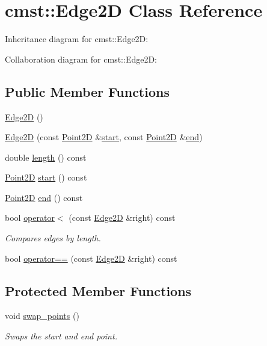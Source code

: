 \hypertarget{classcmst_1_1_edge2_d}{}\section{cmst::Edge2D Class Reference}
\label{classcmst_1_1_edge2_d}


Inheritance diagram for cmst::Edge2D:


Collaboration diagram for cmst::Edge2D:
\subsection*{Public Member Functions}
\begin{DoxyCompactItemize}
\item 
\hyperlink{classcmst_1_1_edge2_d_a5af466b468749d363692f16de84a85d5}{Edge2D} ()
\item 
\hyperlink{classcmst_1_1_edge2_d_a0d1166315f84757395e889d3225e2ae0}{Edge2D} (const \hyperlink{classcmst_1_1_point2_d}{Point2D} \&\hyperlink{classcmst_1_1_edge2_d_ad77218c63818fe92f43033ba1487ab89}{start}, const \hyperlink{classcmst_1_1_point2_d}{Point2D} \&\hyperlink{classcmst_1_1_edge2_d_af02d43d8344759ac3709d318e26cdcee}{end})
\item 
double \hyperlink{classcmst_1_1_edge2_d_adaa859c8f6b412e1174abe8d8b429ce9}{length} () const 
\item 
\hyperlink{classcmst_1_1_point2_d}{Point2D} \hyperlink{classcmst_1_1_edge2_d_ad77218c63818fe92f43033ba1487ab89}{start} () const 
\item 
\hyperlink{classcmst_1_1_point2_d}{Point2D} \hyperlink{classcmst_1_1_edge2_d_af02d43d8344759ac3709d318e26cdcee}{end} () const 
\item 
bool \hyperlink{classcmst_1_1_edge2_d_ab710dba1b2f0a4c74d01a7b2c1211efa}{operator$<$} (const \hyperlink{classcmst_1_1_edge2_d}{Edge2D} \&right) const 
\begin{DoxyCompactList}\small\item\em Compares edges by length. \end{DoxyCompactList}\item 
bool \hyperlink{classcmst_1_1_edge2_d_a4370b0ab916b4fd8d5ff98733ae57116}{operator==} (const \hyperlink{classcmst_1_1_edge2_d}{Edge2D} \&right) const 
\end{DoxyCompactItemize}
\subsection*{Protected Member Functions}
\begin{DoxyCompactItemize}
\item 
void \hyperlink{classcmst_1_1_edge2_d_aeb88dc66750f6c7967de0918e906abf4}{swap\_points} ()
\begin{DoxyCompactList}\small\item\em Swaps the start and end point. \end{DoxyCompactList}\end{DoxyCompactItemize}
